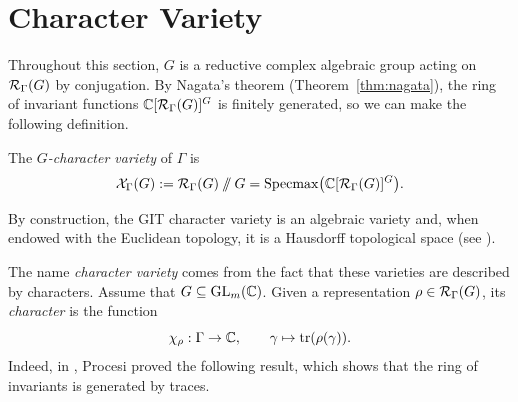 \section{Character Variety}

Throughout this section, $G$ is a reductive complex algebraic group acting on $\RepVar{\Gamma}{G}$ by conjugation. By Nagata's theorem (Theorem~\ref{thm:nagata}), the ring of invariant functions $\CC[\RepVar{\Gamma}{G}]^G$ is finitely generated, so we can make the following definition.

\begin{definition}
    The \emph{$G$-character variety} of $\Gamma$ is
    \[
        \mathcal{X}_\Gamma(G) := \RepVar{\Gamma}{G} \git G = \Specmax\bigl(\CC[\RepVar{\Gamma}{G}]^G\bigr).
    \]
\end{definition}


By construction, the GIT character variety is an algebraic variety and, when endowed with the Euclidean topology, it is a Hausdorff topological space (see \cite[Lemma~3.3.3]{maret_note_nodate}).

The name \emph{character variety} comes from the fact that these varieties are described by characters. Assume that $G \subseteq \operatorname{GL}_m(\mathbb{C})$. Given a representation $\rho \in \RepVar{\Gamma}{G}$, its \emph{character} is the function
\[
    \chi_\rho : \Gamma \to \mathbb{C}, \qquad \gamma \mapsto \operatorname{tr}(\rho(\gamma)).
\]
Indeed, in \cite{procesiInvariantTheoryMatrices1976}, Procesi proved the following result, which shows that the ring of invariants is generated by traces.


